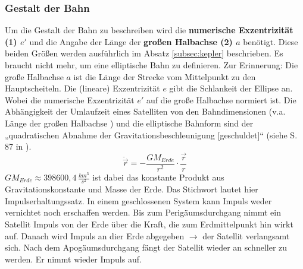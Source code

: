 \subsubsection{Gestalt der Bahn}
Um die Gestalt der Bahn zu beschreiben wird die \textbf{numerische Exzentrizität (1) \ensuremath{e'}} und die Angabe der Länge der \textbf{großen Halbachse (2) \ensuremath{a}} benötigt. Diese beiden Größen werden ausführlich im Absatz \ref{subsec:kepler} beschrieben. Es braucht nicht mehr, um eine elliptische Bahn zu definieren. Zur Erinnerung: Die große Halbachse \ensuremath{a} ist die Länge der Strecke vom Mittelpunkt zu den Hauptscheiteln. Die (lineare) Exzentrizität \ensuremath{e} gibt die Schlankeit der Ellipse an. Wobei die numerische Exzentrizität \ensuremath{e'} auf die große Halbachse normiert ist.  
\newpar
Die Abhängigkeit der Umlaufzeit eines Satelliten von den Bahndimensionen (v.a. Länge der großen Halbachse ) und die elliptische Bahnform sind der „quadratischen Abnahme der Gravitationsbeschleunigung [geschuldet]“ (siehe S. 87 in \cite{HandRaum}). 
\begin{equation}
\ddot{\vec{r}}=-\frac{GM_{Erde}}{r^2}\cdot\frac{\vec{r}}{r}
\end{equation}    
\ensuremath{GM_{Erde} \approx 398600,4\,\frac{km^3}{s^2}} ist dabei das konstante Produkt aus Gravitationskonstante und Masse der Erde. Das Stichwort lautet hier Impulserhaltungssatz. In einem geschlossenen System kann Impuls weder vernichtet noch erschaffen werden. Bis zum Perigäumsdurchgang nimmt ein Satellit Impuls von der Erde über die Kraft, die zum Erdmittelpunkt hin wirkt auf. Danach wird Impuls an dier Erde abgegeben \ensuremath{\rightarrow} der Satellit verlangsamt sich. Nach dem Apogäumsdurchgang fängt der Satellit wieder an schneller zu werden. Er nimmt wieder Impuls auf.  
  
